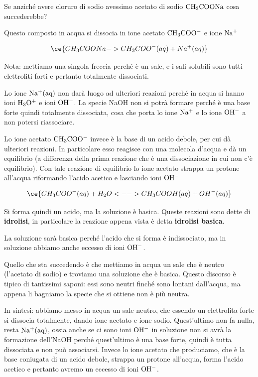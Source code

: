 Se anziché avere cloruro di sodio avessimo acetato di sodio $\rm CH_3COONa$ cosa succederebbe?

Questo composto in acqua si dissocia in ione acetato $\rm CH_3COO^-$ e ione $\rm Na^+$

$$\ce{CH_3COONa -> CH_3COO^-(aq) + Na^+(aq)}$$

Nota: mettiamo una singola freccia perché è un sale, e i sali solubili sono tutti elettroliti forti e pertanto totalmente dissociati.

Lo ione $\rm Na^+(aq)$ non darà luogo ad ulteriori reazioni perché in acqua si hanno ioni $\rm H_3O^+$ e ioni $\rm OH^-$. La specie NaOH non si potrà formare perché è una base forte quindi totalmente dissociata, cosa che porta lo ione $\rm Na^+$ e lo ione $\rm OH^-$ a non potersi riassociare.

Lo ione acetato $\rm CH_3COO^-$ invece è la base di un acido debole, per cui dà ulteriori reazioni. In particolare esso reagisce con una molecola d'acqua e dà un equilibrio (a differenza della prima reazione che è una dissociazione in cui non c'è equilibrio). Con tale reazione di equilibrio lo ione acetato strappa un protone all'acqua riformando l'acido acetico e lasciando ioni $\rm OH^-$

$$\ce{CH_3COO^-(aq) + H_2O <--> CH_3COOH(aq) + OH^-(aq)}$$

Si forma quindi un acido, ma la soluzione è basica. Queste reazioni sono dette di \textbf{idrolisi}, in particolare la reazione appena vista è detta \textbf{idrolisi basica}.

La soluzione sarà basica perché l'acido che si forma è indissociato, ma in soluzione abbiamo anche eccesso di ioni $\rm OH^-$.

Quello che sta succedendo è che mettiamo in acqua un sale che è neutro (l'acetato di sodio) e troviamo una soluzione che è basica. Questo discorso è tipico di tantissimi saponi: essi sono neutri finché sono lontani dall'acqua, ma appena li bagniamo la specie che si ottiene non è più neutra.

In sintesi: abbiamo messo in acqua un sale neutro, che essendo un elettrolita forte si dissocia totalmente, dando ione acetato e ione sodio. Quest'ultimo non fa nulla, resta $\rm Na^+(aq)$, ossia anche se ci sono ioni $\rm OH^-$ in soluzione non si avrà la formazione dell'NaOH perché quest'ultimo è una base forte, quindi è tutta dissociata e non può associarsi. Invece lo ione acetato che produciamo, che è la base coniugata di un acido debole, strappa un protone all'acqua, forma l'acido acetico e pertanto avremo un eccesso di ioni $\rm OH^-$.

